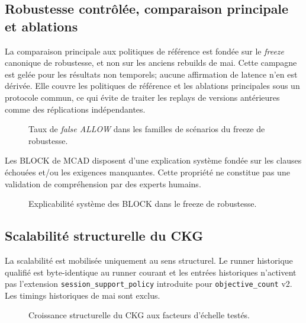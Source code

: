 \subsection{Robustesse contrôlée, comparaison principale et ablations}

La comparaison principale aux politiques de référence est fondée sur le
\emph{freeze} canonique de robustesse, et non sur les anciens rebuilds de mai.
Cette campagne est gelée pour les résultats non temporels; aucune affirmation
de latence n'en est dérivée. Elle couvre les politiques de référence et les
ablations principales sous un protocole commun, ce qui évite de traiter les
replays de versions antérieures comme des réplications indépendantes.



\begin{figure}[t]
\centering

\caption{Taux de \emph{false ALLOW} dans les familles de scénarios du freeze de robustesse.}
\label{fig:v3-robustness-false-allow}
\end{figure}

Les BLOCK de MCAD disposent d'une explication système fondée sur les clauses
échouées et/ou les exigences manquantes. Cette propriété ne constitue pas une
validation de compréhension par des experts humains.

\begin{figure}[t]
\centering

\caption{Explicabilité système des BLOCK dans le freeze de robustesse.}
\label{fig:v3-robustness-explainability}
\end{figure}

\subsection{Scalabilité structurelle du CKG}

La scalabilité est mobilisée uniquement au sens structurel. Le runner
historique qualifié est byte-identique au runner courant et les entrées
historiques n'activent pas l'extension \texttt{session\_support\_policy}
introduite pour \texttt{objective\_count} v2. Les timings historiques de mai
sont exclus.



\begin{figure}[t]
\centering

\caption{Croissance structurelle du CKG aux facteurs d'échelle testés.}
\label{fig:v3-scalability-structure}
\end{figure}

